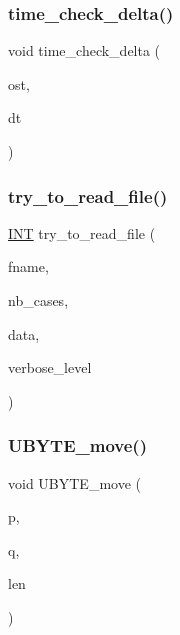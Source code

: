 \subsubsection{\texorpdfstring{time\+\_\+check\+\_\+delta()}{time\_check\_delta()}}
{\footnotesize\ttfamily void time\+\_\+check\+\_\+delta (\begin{DoxyParamCaption}\item[{ostream \&}]{ost,  }\item[{\mbox{\hyperlink{galois_8h_a09fddde158a3a20bd2dcadb609de11dc}{I\+NT}}}]{dt }\end{DoxyParamCaption})}

\mbox{\label{util_8_c_a1097b6ad7e39d3771b7e6a2fcb9326e9}} 
\subsubsection{\texorpdfstring{try\+\_\+to\+\_\+read\+\_\+file()}{try\_to\_read\_file()}}
{\footnotesize\ttfamily \mbox{\hyperlink{galois_8h_a09fddde158a3a20bd2dcadb609de11dc}{I\+NT}} try\+\_\+to\+\_\+read\+\_\+file (\begin{DoxyParamCaption}\item[{const \mbox{\hyperlink{galois_8h_ab6cc7b4aeb6ea31aba2b3fbfc83ff5e6}{B\+Y\+TE}} $\ast$}]{fname,  }\item[{\mbox{\hyperlink{galois_8h_a09fddde158a3a20bd2dcadb609de11dc}{I\+NT}} \&}]{nb\+\_\+cases,  }\item[{\mbox{\hyperlink{galois_8h_ab6cc7b4aeb6ea31aba2b3fbfc83ff5e6}{B\+Y\+TE}} $\ast$$\ast$\&}]{data,  }\item[{\mbox{\hyperlink{galois_8h_a09fddde158a3a20bd2dcadb609de11dc}{I\+NT}}}]{verbose\+\_\+level }\end{DoxyParamCaption})}

\mbox{\label{util_8_c_ae0491e6776a8371ca5387826b752780b}} 
\subsubsection{\texorpdfstring{U\+B\+Y\+T\+E\+\_\+move()}{UBYTE\_move()}}
{\footnotesize\ttfamily void U\+B\+Y\+T\+E\+\_\+move (\begin{DoxyParamCaption}\item[{\mbox{\hyperlink{galois_8h_a122c4acf389c050379f00341fdcd5812}{U\+B\+Y\+TE}} $\ast$}]{p,  }\item[{\mbox{\hyperlink{galois_8h_a122c4acf389c050379f00341fdcd5812}{U\+B\+Y\+TE}} $\ast$}]{q,  }\item[{\mbox{\hyperlink{galois_8h_a09fddde158a3a20bd2dcadb609de11dc}{I\+NT}}}]{len }\end{DoxyParamCaption})}

